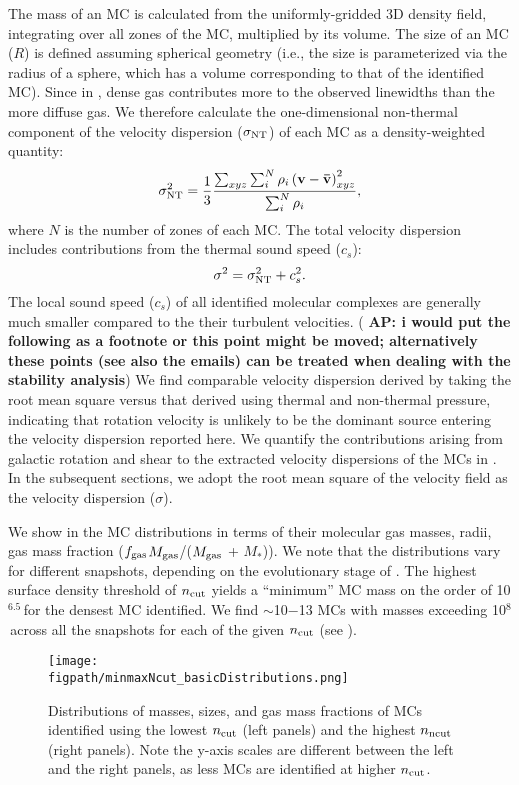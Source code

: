 \documentclass[iop]{emulateapj} %
\newcommand{\AP}[1]{({\bf \color{apcolor} AP: #1})}
\begin{document}
The mass of an MC is calculated from the uniformly-gridded 3D density field,
integrating over all zones of the MC, multiplied by its volume. 
The size of an MC ($R$) is defined assuming spherical geometry (i.e., 
the size is parameterized via the radius of a sphere, which has a volume corresponding to that of the identified MC).
Since in \obs, dense gas contributes more to the observed linewidths than the more diffuse gas. We therefore calculate 
the one-dimensional non-thermal component of the velocity dispersion ($\sigma_{\rm NT}$) of each MC as a density-weighted quantity:
\begin{equation}
\sigma_{\rm NT}^2 = \frac{1}{{3}}\frac{\sum_{xyz} \sum_{i}^N \rho_i \left(\mathbf{v} - \mathbf{\bar v}\right)_{xyz}^2}{\sum_i^N \rho_i},
\end{equation}
where $N$ is the number of zones of each MC.
The total velocity dispersion includes contributions from the thermal sound speed ($c_s$):
\begin{equation}
\sigma^2 = \sigma_{\rm NT}^2 + c_s^2.
\end{equation}
The local sound speed ($c_s$)
of all identified molecular complexes are generally much smaller compared to the their
turbulent velocities.
\AP{i would put the following as a footnote or this point might be moved; alternatively these points (see also the emails) can be treated when dealing with the stability analysis}
We find comparable velocity dispersion derived by taking the root mean square versus
that derived using thermal and non-thermal pressure, indicating that
rotation velocity is unlikely to be the dominant source entering the velocity dispersion reported here.
We quantify the contributions arising from galactic rotation and shear to the extracted velocity dispersions of the MCs in .
In the subsequent sections, we adopt the root mean square of the velocity field
as the velocity dispersion ($\sigma$).


We show in  the MC distributions in terms of their
molecular gas masses, radii, gas mass fraction ($f_{\rm gas}$\eq$M_{\rm gas}$/($M_{\rm gas}$ +
$M_*$)).
We note that the distributions vary for different snapshots, depending on the evolutionary stage of \flower.
The highest surface density threshold of $n_{\rm cut}$ yields a ``minimum'' MC mass on
the order of 10$^{6.5}$\,\Msun for the densest MC identified.
We find $\sim$10$-$13 MCs with masses exceeding 10$^8$\,\Msun across all the
snapshots for each of the given $n_{\rm cut}$ (see ).

\begin{figure*}[htbp]
\centering
\texttt{[image: \\figpath/minmaxNcut\_basicDistributions.png]}
\caption{
Distributions of masses, sizes, and gas mass fractions of MCs identified using 
the lowest $n_{\rm cut}$ (left panels) and the highest $n_{\rm ncut}$ (right panels).
Note the y-axis scales are different between the left and the right panels, as less MCs are identified 
at higher $n_{\rm cut}$.
\label{fig:dist}}
\end{figure*}
\end{document}
